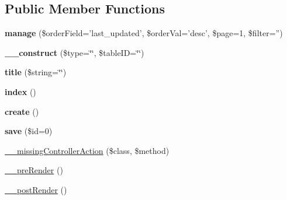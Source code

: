 \subsection*{Public Member Functions}
\begin{DoxyCompactItemize}
\item 
\hypertarget{class_table_controller_ad7a8a1631b0c07e5eaac56371b48d5c8}{
{\bfseries manage} (\$orderField='last\_\-updated', \$orderVal='desc', \$page=1, \$filter='')}
\label{class_table_controller_ad7a8a1631b0c07e5eaac56371b48d5c8}

\item 
\hypertarget{class_table_controller_abeb6a2efaea8b3fb9fa9877a398e71ba}{
{\bfseries \_\-\_\-construct} (\$type=\char`\"{}\char`\"{}, \$tableID=\char`\"{}\char`\"{})}
\label{class_table_controller_abeb6a2efaea8b3fb9fa9877a398e71ba}

\item 
\hypertarget{class_table_controller_a09086607bdf0caa184393e8fa08a55bc}{
{\bfseries title} (\$string=\char`\"{}\char`\"{})}
\label{class_table_controller_a09086607bdf0caa184393e8fa08a55bc}

\item 
\hypertarget{class_table_controller_a149eb92716c1084a935e04a8d95f7347}{
{\bfseries index} ()}
\label{class_table_controller_a149eb92716c1084a935e04a8d95f7347}

\item 
\hypertarget{class_table_controller_a435e7d7525d4bcd0ed5e34a469f3adf6}{
{\bfseries create} ()}
\label{class_table_controller_a435e7d7525d4bcd0ed5e34a469f3adf6}

\item 
\hypertarget{class_table_controller_a1a4fb85b713fd3fae33e237428c918f3}{
{\bfseries save} (\$id=0)}
\label{class_table_controller_a1a4fb85b713fd3fae33e237428c918f3}

\item 
\hyperlink{class_controller_a728c573e418d1f979340a4669524cacd}{\_\-\_\-missingControllerAction} (\$class, \$method)
\item 
\hyperlink{class_controller_ad86994d2463ea27cab892176e6509bdb}{\_\-\_\-preRender} ()
\item 
\hyperlink{class_controller_adc3c9cc4788f7ba7d1368fdc43568b1d}{\_\-\_\-postRender} ()
\end{DoxyCompactItemize}
